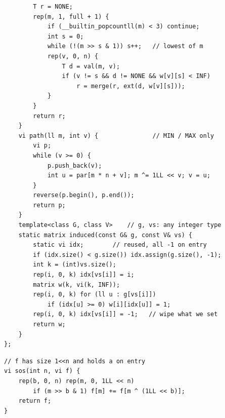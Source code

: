 \begin{lstlisting}
        T r = NONE;
        rep(m, 1, full + 1) {
            if (__builtin_popcountll(m) < 3) continue;
            int s = 0;
            while (!(m >> s & 1)) s++;   // lowest of m
            rep(v, 0, n) {
                T d = val(m, v);
                if (v != s && d != NONE && w[v][s] < INF)
                    r = merge(r, ext(d, w[v][s]));
            }
        }
        return r;
    }
    vi path(ll m, int v) {               // MIN / MAX only
        vi p;
        while (v >= 0) {
            p.push_back(v);
            int u = par[m * n + v]; m ^= 1LL << v; v = u;
        }
        reverse(p.begin(), p.end());
        return p;
    }
    template<class G, class V>    // g, vs: any integer type
    static matrix induced(const G& g, const V& vs) {
        static vi idx;        // reused, all -1 on entry
        if (idx.size() < g.size()) idx.assign(g.size(), -1);
        int k = (int)vs.size();
        rep(i, 0, k) idx[vs[i]] = i;
        matrix w(k, vi(k, INF));
        rep(i, 0, k) for (ll u : g[vs[i]])
            if (idx[u] >= 0) w[i][idx[u]] = 1;
        rep(i, 0, k) idx[vs[i]] = -1;   // wipe what we set
        return w;
    }
};
\end{lstlisting}


\begin{lstlisting}
// f has size 1<<n and holds a on entry
vi sos(int n, vi f) {
    rep(b, 0, n) rep(m, 0, 1LL << n)
        if (m >> b & 1) f[m] += f[m ^ (1LL << b)];
    return f;
}
\end{lstlisting}


